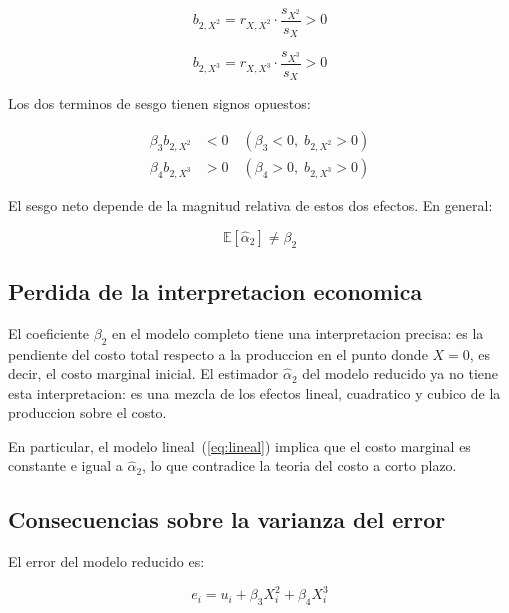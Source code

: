 \documentclass[12pt, letterpaper]{article}
\theoremstyle{remark}
\newcommand{\E}{\mathbb{E}}
\begin{document}
\begin{equation}
  b_{2,X^2} = r_{X,X^2} \cdot \frac{s_{X^2}}{s_X} > 0
  \label{eq:b_X2}
\end{equation}

\begin{equation}
  b_{2,X^3} = r_{X,X^3} \cdot \frac{s_{X^3}}{s_X} > 0
  \label{eq:b_X3}
\end{equation}

Los dos terminos de sesgo tienen signos opuestos:

\begin{align}
  \beta_3 b_{2,X^2} &< 0 \quad (\beta_3 < 0, \; b_{2,X^2} > 0)\\
  \beta_4 b_{2,X^3} &> 0 \quad (\beta_4 > 0, \; b_{2,X^3} > 0)
\end{align}

El sesgo neto depende de la magnitud relativa de estos dos efectos.
En general:

\begin{equation}
  \E[\hat\alpha_2] \neq \beta_2
  \label{eq:sesgo_neto}
\end{equation}

\subsection{Perdida de la interpretacion economica}

El coeficiente $\beta_2$ en el modelo completo tiene una interpretacion
precisa: es la pendiente del costo total respecto a la produccion en el
punto donde $X = 0$, es decir, el costo marginal inicial. El estimador
$\hat\alpha_2$ del modelo reducido ya no tiene esta interpretacion: es
una mezcla de los efectos lineal, cuadratico y cubico de la produccion
sobre el costo.

En particular, el modelo lineal~(\ref{eq:lineal}) implica que el costo
marginal es constante e igual a $\hat\alpha_2$, lo que contradice la
teoria del costo a corto plazo.

\subsection{Consecuencias sobre la varianza del error}

El error del modelo reducido es:

\begin{equation}
  e_i = u_i + \beta_3 X_i^2 + \beta_4 X_i^3
  \label{eq:error_reducido}
\end{equation}
\end{document}
